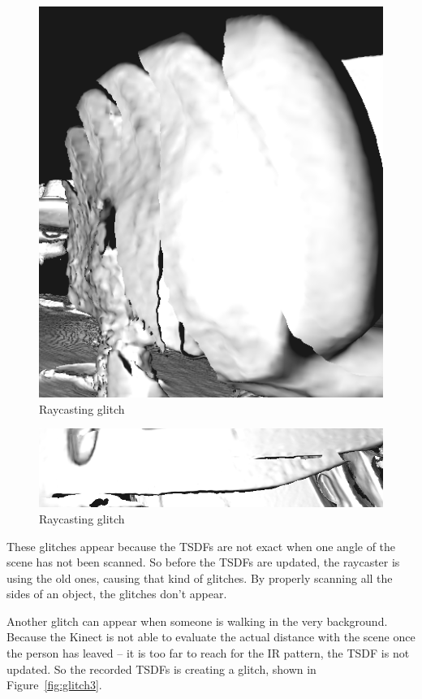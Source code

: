 \documentclass[12pt]{article}
\begin{document}
\begin{figure}[!h]
  \centering
  \includegraphics[scale=0.3]{glitch1.png}
  \caption{\label{fig:glitch1} Raycasting glitch}
\end{figure}

\begin{figure}[!h]
  \centering
  \includegraphics[scale=0.3]{glitch2.png}
  \caption{\label{fig:glitch2} Raycasting glitch}
\end{figure}

These glitches appear because the TSDFs are not exact when one angle of the scene has not been scanned. So before the TSDFs are updated, the raycaster is using the old ones, causing that kind of glitches. By properly scanning all the sides of an object, the glitches don't appear.

Another glitch can appear when someone is walking in the very background. Because the Kinect is not able to evaluate the actual distance with the scene once the person has leaved -- it is too far to reach for the IR pattern, the TSDF is not updated. So the recorded TSDFs is creating a glitch, shown in Figure~\ref{fig:glitch3}.
\end{document}
